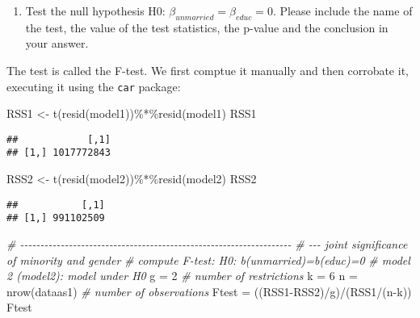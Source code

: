 \documentclass[
]{article}
\newenvironment{Shaded}{\begin{snugshade}}{\end{snugshade}}
\newcommand{\CommentTok}[1]{\textcolor[rgb]{0.56,0.35,0.01}{\textit{#1}}}
\newcommand{\DecValTok}[1]{\textcolor[rgb]{0.00,0.00,0.81}{#1}}
\newcommand{\FunctionTok}[1]{\textcolor[rgb]{0.00,0.00,0.00}{#1}}
\newcommand{\NormalTok}[1]{#1}
\newcommand{\OtherTok}[1]{\textcolor[rgb]{0.56,0.35,0.01}{#1}}
\newcommand{\SpecialCharTok}[1]{\textcolor[rgb]{0.00,0.00,0.00}{#1}}
\providecommand{\tightlist}{%
  \setlength{\itemsep}{0pt}\setlength{\parskip}{0pt}}
\begin{document}
\begin{enumerate}
\def\labelenumi{\alph{enumi}.}
\setcounter{enumi}{1}
\tightlist
\item
  Test the null hypothesis H0: \(\beta_{unmarried}=\beta_{educ}=0\).
  Please include the name of the test, the value of the test statistics,
  the p-value and the conclusion in your answer.
\end{enumerate}

The test is called the F-test. We first comptue it manually and then
corrobate it, executing it using the \texttt{car} package:

\small

\begin{Shaded}
\begin{Highlighting}[]
\NormalTok{RSS1 }\OtherTok{\textless{}{-}} \FunctionTok{t}\NormalTok{(}\FunctionTok{resid}\NormalTok{(model1))}\SpecialCharTok{\%*\%}\FunctionTok{resid}\NormalTok{(model1)}
\NormalTok{RSS1}
\end{Highlighting}
\end{Shaded}

\begin{verbatim}
##            [,1]
## [1,] 1017772843
\end{verbatim}

\begin{Shaded}
\begin{Highlighting}[]
\NormalTok{RSS2 }\OtherTok{\textless{}{-}} \FunctionTok{t}\NormalTok{(}\FunctionTok{resid}\NormalTok{(model2))}\SpecialCharTok{\%*\%}\FunctionTok{resid}\NormalTok{(model2)}
\NormalTok{RSS2}
\end{Highlighting}
\end{Shaded}

\begin{verbatim}
##           [,1]
## [1,] 991102509
\end{verbatim}

\begin{Shaded}
\begin{Highlighting}[]
\CommentTok{\# {-}{-}{-}{-}{-}{-}{-}{-}{-}{-}{-}{-}{-}{-}{-}{-}{-}{-}{-}{-}{-}{-}{-}{-}{-}{-}{-}{-}{-}{-}{-}{-}{-}{-}{-}{-}{-}{-}{-}{-}{-}{-}{-}{-}{-}{-}{-}{-}{-}{-}{-}{-}{-}{-}{-}{-}{-}{-}{-}{-}{-}{-}{-}{-}{-}{-}{-}}
\CommentTok{\# {-}{-}{-} joint significance of minority and gender}
\CommentTok{\# compute F{-}test: H0: b(unmarried)=b(educ)=0}
\CommentTok{\# model 2 (model2): model under H0}
\NormalTok{g }\OtherTok{=} \DecValTok{2} \CommentTok{\# number of restrictions}
\NormalTok{k }\OtherTok{=} \DecValTok{6}
\NormalTok{n }\OtherTok{=} \FunctionTok{nrow}\NormalTok{(dataas1) }\CommentTok{\# number of observations}
\NormalTok{Ftest }\OtherTok{=}\NormalTok{ ((RSS1}\SpecialCharTok{{-}}\NormalTok{RSS2)}\SpecialCharTok{/}\NormalTok{g)}\SpecialCharTok{/}\NormalTok{(RSS1}\SpecialCharTok{/}\NormalTok{(n}\SpecialCharTok{{-}}\NormalTok{k))}
\NormalTok{Ftest}
\end{Highlighting}
\end{Shaded}
\end{document}
